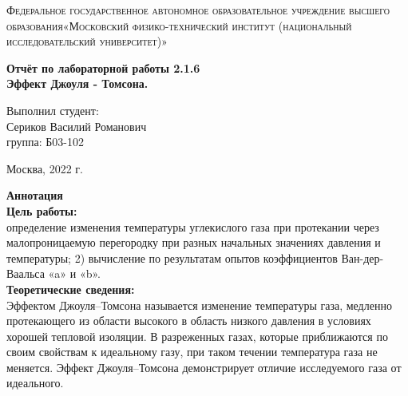 \documentclass[a4paper, 12pt]{article}%
\begin{document}
	\begin{titlepage}
		\begin{center}
			\textsc{Федеральное государственное автономное образовательное учреждение высшего образования«Московский физико-технический институт (национальный исследовательский университет)»\\[5mm]
			}
			
			\vfill
			
			\textbf{Отчёт по лабораторной работы 2.1.6\\[3mm]
				Эффект Джоуля - Томсона.
				\\[50mm]
			}
			
		\end{center}
		
		\hfill
		\begin{minipage}{.5\textwidth}
			Выполнил студент:\\[2mm]
			Сериков Василий Романович\\[2mm]
			группа: Б03-102\\[5mm]
			
		\end{minipage}
		\vfill
		\begin{center}
			Москва, 2022 г.
		\end{center}
		
	\end{titlepage}
	
	\newpage
	\textbf{Аннотация}\\
	
	
	\textbf{Цель работы: }\\
	
	определение изменения температуры углекислого газа при протекании через малопроницаемую перегородку при разных начальных значениях давления и температуры; 2) вычисление по результатам опытов коэффициентов Ван-дер-Ваальса «a» и «b».\\
	
	
	\textbf{Теоретические сведения: } \\
	
	Эффектом Джоуля–Томсона называется изменение температуры газа, медленно протекающего из области высокого в область низкого давления в условиях хорошей тепловой изоляции. В разреженных газах, которые приближаются по своим свойствам к идеальному газу, при таком течении температура газа не меняется. Эффект Джоуля–Томсона демонстрирует отличие исследуемого газа от идеального.\\
	
\end{document}
